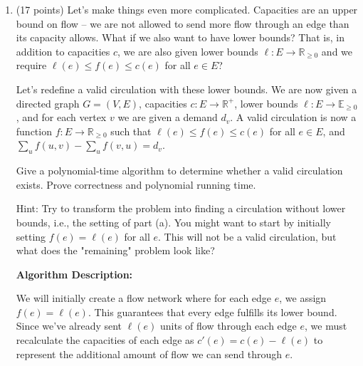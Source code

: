 \documentclass[11pt]{article}
\begin{document}
\begin{enumerate}
Finally, we run Edmonds-Karp to find $M$. As per \textbf{Theorem 20.3.4}, the runtime is $O(m^{2}n)$. 
However, the number of edges in the graph we run Edmonds-Karp on is not $m$, since for each vertex, we can add an edge from $s$ or to $t$. 
This means the number of edges in the graph is at most $O(m + n)$. Thus, the runtime of this step is $O(n(m + n)^{2})$
The final check of $M$ against $D$ takes $O(1)$ time.

Thus, the total runtime is:

$$O(n) + O(n) + O(n(m + n)^{2}) + O(1)$$

The term $O(n(m + n)^{2})$ dominates, yielding a simplified total runtime of:

$$O(n(m + n)^{2})$$

\bigbreak

\item (17 points) Let's make things even more complicated. Capacities are an upper bound on flow -- we are not allowed to send more flow through an edge 
than its capacity allows.  What if we also want to have lower bounds? That is, in addition to capacities $c$, we are also given lower bounds 
$\ell : E \rightarrow \mathbb{R}_{\geq 0}$ and we require $\ell(e) \leq f(e) \leq c(e)$ for all $e \in E$?

Let's redefine a valid circulation with these lower bounds. We are now given a directed graph $G = (V,E)$, capacities $c : E \rightarrow \mathbb{R}^+$, 
lower bounds $\ell : E \rightarrow \mathbb{E}_{\geq 0}$, and for each vertex $v$ we are given a demand $d_v$. A valid circulation is now a function 
$f : E \rightarrow \mathbb{R}_{\geq 0}$ such that $\ell(e) \leq f(e) \leq c(e)$ for all $e \in E$, and $\sum_{u} f(u,v) - \sum_{u} f(v,u) = d_v$.

Give a polynomial-time algorithm to determine whether a valid circulation exists. Prove correctness and polynomial running time. 

Hint: Try to transform the problem into finding a circulation without lower bounds, i.e., the setting of part (a). You might want to start by 
initially setting $f(e)= \ell(e)$ for all $e$. This will not be a valid circulation, but what does the "remaining" problem look like?

\bigbreak

\textbf{Algorithm Description:}

We will initially create a flow network where for each edge $e$, we assign $f(e) = \ell(e)$. 
This guarantees that every edge fulfills its lower bound. Since we've already sent $\ell(e)$ units of flow through each edge $e$, 
we must recalculate the capacities of each edge as $c'(e) = c(e) - \ell(e)$ to represent the additional amount of flow we can send through $e$.


\end{enumerate}
\end{document}
